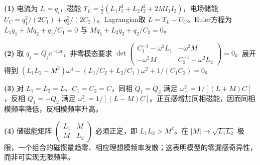 \par\noindent\textbf{(1)} 电流为 \(I_i=\dot q_i\)，磁能 \(T_L=\tfrac12(L_1I_1^2+L_2I_2^2+2MI_1I_2)\)，电场储能 \(U_C=q_1^2/(2C_1)+q_2^2/(2C_2)\)。Lagrangian取 \(L=T_L-U_C\)。Euler方程为 \(L_1\ddot q_1+M\ddot q_2+q_1/C_1=0\) 与 \(M\ddot q_1+L_2\ddot q_2+q_2/C_2=0\)。
\par\noindent\textbf{(2)} 取 \(q_j=Q_je^{-i\omega t}\)，非零模态要求 \(\det\begin{pmatrix}C_1^{-1}-\omega^2L_1&-\omega^2M\\-\omega^2M&C_2^{-1}-\omega^2L_2\end{pmatrix}=0\)。展开得到 \((L_1L_2-M^2)\omega^4-(L_1/C_2+L_2/C_1)\omega^2+1/(C_1C_2)=0\)。
\par\noindent\textbf{(3)} 对 \(L_1=L_2=L\)、\(C_1=C_2=C\)，同相 \(Q_1=Q_2\) 满足 \(\omega_+^2=1/[(L+M)C]\)，反相 \(Q_1=-Q_2\) 满足 \(\omega_-^2=1/[(L-M)C]\)。正互感增加同相磁能，因而同相模频率降低，反相模频率升高。
\par\noindent\textbf{(4)} 储磁能矩阵 \(\begin{pmatrix}L_1&M\\M&L_2\end{pmatrix}\) 必须正定，即 \(L_1L_2>M^2\)。在 \(|M|\to\sqrt{L_1L_2}\) 极限，一个组合的磁惯量趋零、相应理想模频率发散；这表明模型的零漏感奇异性，而非可实现无限频率。
